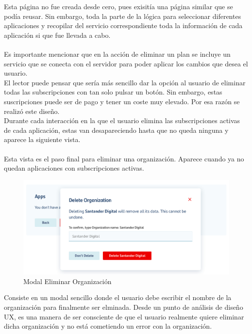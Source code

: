 \documentclass[a4paper,12pt]{article}
\begin{document}
\begin{itemize}
\begin{itemize}
        Esta página no fue creada desde cero, pues exisitía una página similar que se podía reusar. Sin embargo, toda la parte de la lógica para seleccionar diferentes aplicaciones y recopilar del servicio correspondiente toda la información de cada aplicación si que fue llevada a cabo.\\
        \\
        Es importante mencionar que en la acción de eliminar un plan se incluye un servicio que se conecta con el servidor para poder aplicar los cambios que desea el usuario.\\
        El lector puede pensar que sería más sencillo dar la opción al usuario de eliminar todas las subscripciones con tan solo pulsar un botón. Sin embargo, estas suscripciones puede ser de pago y tener un coste muy elevado. Por esa razón se realizó este diseño.\\
        Durante cada interacción en la que el usuario elimina las subscripciones activas de cada aplicación, estas van desapareciendo hasta que no queda ninguna y aparece la siguiente vista.\\
        \\
        Esta vista es el paso final para eliminar una organización. Aparece cuando ya no quedan aplicaciones con subscripciones activas.
        
        \begin{figure}[H]
            \centering
            \includegraphics[scale=0.7]{deleteorg.PNG}
            \caption{Modal Eliminar Organización}
            \label{fig:my_label}
        \end{figure}
        
        Consiste en un modal sencillo donde el usuario debe escribir el nombre de la organización para finalmente ser elminada. Desde un punto de análisis de diseño UX, es una manera de ser consciente de que el usuario realmente quiere eliminar dicha organización y no está cometiendo un error con la organización.
        

\end{itemize}
\end{itemize}
\end{document}
